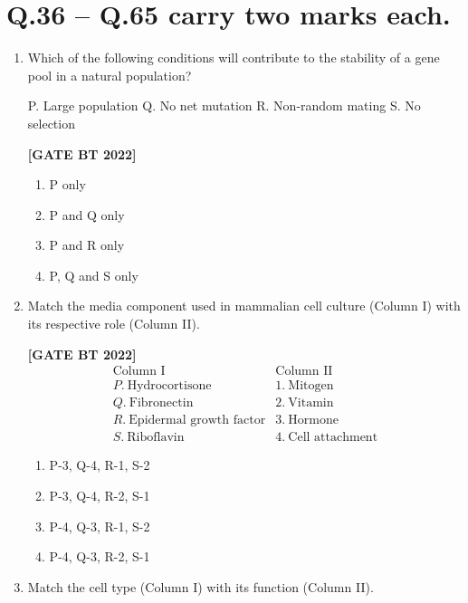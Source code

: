 \documentclass[12pt]{article}
\begin{document}
\section*{Q.36 -- Q.65 carry two marks each.}

\begin{enumerate}[leftmargin=2.5em, label=\textbf{Q.\arabic*}., itemsep=2em, resume]

\item Which of the following conditions will contribute to the stability of a gene pool in a natural population?  

P. Large population  
Q. No net mutation  
R. Non-random mating  
S. No selection  

\noindent \textbf{[GATE BT 2022]}
\begin{multicols}{2}
\begin{enumerate}
    \item P only
    \item P and Q only
    \item P and R only
    \item P, Q and S only
\end{enumerate}
\end{multicols}

\item Match the media component used in mammalian cell culture (Column I) with its respective role (Column II).

\noindent \textbf{[GATE BT 2022]}
\[
\begin{array}{ll}
\text{Column I} & \text{Column II} \\
P. \ \text{Hydrocortisone} & 1. \ \text{Mitogen} \\
Q. \ \text{Fibronectin} & 2. \ \text{Vitamin} \\
R. \ \text{Epidermal growth factor} & 3. \ \text{Hormone} \\
S. \ \text{Riboflavin} & 4. \ \text{Cell attachment}
\end{array}
\]
\begin{multicols}{2}
\begin{enumerate}
    \item P-3, Q-4, R-1, S-2
    \item P-3, Q-4, R-2, S-1
    \item P-4, Q-3, R-1, S-2
    \item P-4, Q-3, R-2, S-1
\end{enumerate}
\end{multicols}

\item Match the cell type (Column I) with its function (Column II).


\end{enumerate}
\end{document}
